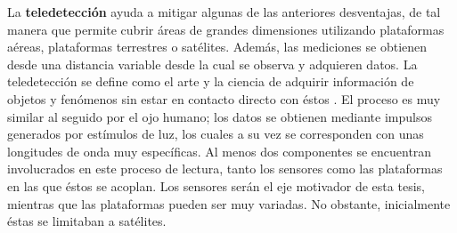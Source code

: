 La \textbf{teledetección} ayuda a mitigar algunas de las anteriores desventajas, de tal manera que permite cubrir áreas de grandes dimensiones utilizando plataformas aéreas, plataformas terrestres o satélites. Además, las mediciones se obtienen desde una distancia variable desde la cual se observa y adquieren datos. La teledetección se define como el arte y la ciencia de adquirir información de objetos y fenómenos sin estar en contacto directo con éstos \cite{lillesand_remote_2015}. El proceso es muy similar al seguido por el ojo humano; los datos se obtienen mediante impulsos generados por estímulos de luz, los cuales a su vez se corresponden con unas longitudes de onda muy específicas. Al menos dos componentes se encuentran involucrados en este proceso de lectura, tanto los sensores como las plataformas en las que éstos se acoplan. Los sensores serán el eje motivador de esta tesis, mientras que las plataformas pueden ser muy variadas. No obstante, inicialmente éstas se limitaban a satélites. 

